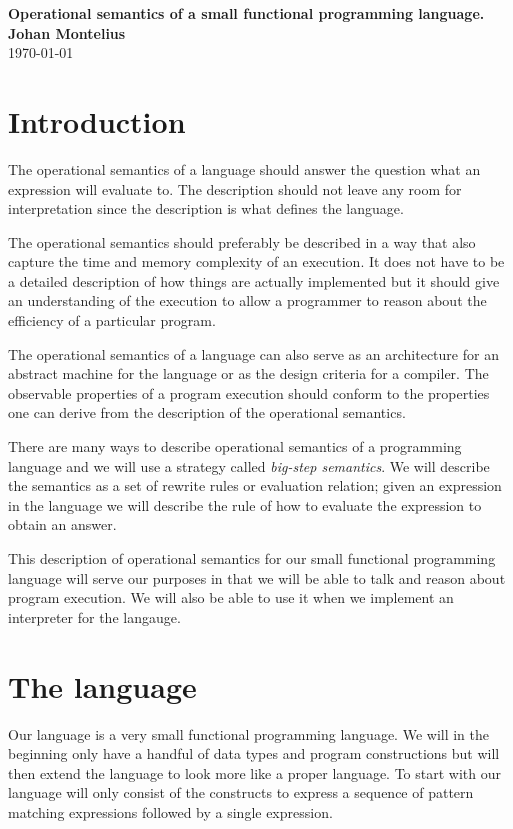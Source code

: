 \documentclass[a4paper,11pt]{article}
\newcommand{\nnsection}[1]{
\section*{#1}
\addcontentsline{toc}{section}{#1}
}
\begin{document}
\begin{center}
\vspace{20pt}
\textbf{\large Operational semantics of a small functional programming language.}\\
\vspace{10pt}
\textbf{Johan Montelius}\\
\vspace{10pt}
\today{}
\end{center}


\nnsection{Introduction}

The operational semantics of a language should answer the question
what an expression will evaluate to. The description should not leave
any room for interpretation since the description is what defines the
language.

The operational semantics should preferably be described in a way that
also capture the time and memory complexity of an execution. It
does not have to be a detailed description of how things are actually
implemented but it should give an understanding of the execution to
allow a programmer to reason about the efficiency of a particular
program.

The operational semantics of a language can also serve as an
architecture for an abstract machine for the language or as the design
criteria for a compiler. The observable properties of a program
execution should conform to the properties one can derive from the
description of the operational semantics.

There are many ways to describe operational semantics of a
programming language and we will use a strategy called {\em big-step
  semantics}. We will describe the semantics as a set of rewrite rules
or evaluation relation; given an expression in the language we will
describe the rule of how to evaluate the expression to obtain an
answer.

This description of operational semantics for our small functional
programming language will serve our purposes in that we will be able
to talk and reason about program execution. We will also be able to
use it when we implement an interpreter for the langauge.


\section{The language}

Our language is a very small functional programming language. We will
in the beginning only have a handful of data types and program
constructions but will then extend the language to look more like a
proper language. To start with our language will only consist of the
constructs to express a sequence of pattern matching expressions
followed by a single expression.
\end{document}
